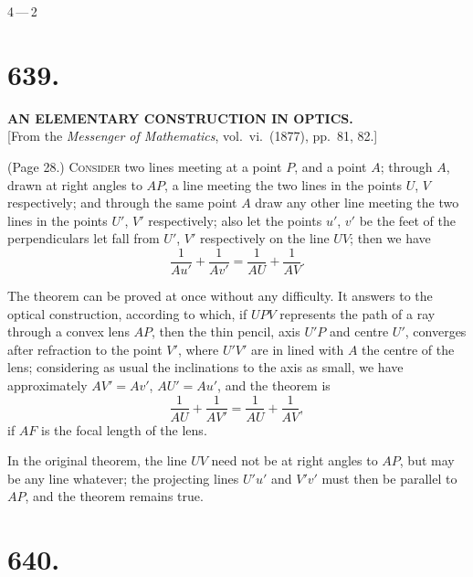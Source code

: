 \documentclass[11pt,a4paper]{article}
\begin{document}
\hfill 4\,---\,2

\bigskip


\section*{639.}

\begin{center}
\textbf{AN ELEMENTARY CONSTRUCTION IN OPTICS.}\\[1em]
[From the \textit{Messenger of Mathematics}, vol.~vi.\ (1877), pp.\ 81, 82.]
\end{center}

\medskip

\noindent (Page 28.) \textsc{Consider} two lines meeting at a point $P$, and a point $A$; through $A$, drawn at right angles to $AP$, a line meeting the two lines in the points $U$, $V$ respectively; and through the same point $A$ draw any other line meeting the two lines in the points $U'$, $V'$ respectively; also let the points $u'$, $v'$ be the feet of the perpendiculars let fall from $U'$, $V'$ respectively on the line $UV$; then we have
\[
\frac{1}{Au'} + \frac{1}{Av'} = \frac{1}{AU} + \frac{1}{AV}.
\]

The theorem can be proved at once without any difficulty. It answers to the optical construction, according to which, if $UPV$ represents the path of a ray through a convex lens $AP$, then the thin pencil, axis $U'P$ and centre $U'$, converges after refraction to the point $V'$, where $U'V'$ are in lined with $A$ the centre of the lens; considering as usual the inclinations to the axis as small, we have approximately $AV' = Av'$, $AU' = Au'$, and the theorem is
\[
\frac{1}{AU} + \frac{1}{AV'} = \frac{1}{AU} + \frac{1}{AV},
\]
if $AF$ is the focal length of the lens.

In the original theorem, the line $UV$ need not be at right angles to $AP$, but may be any line whatever; the projecting lines $U'u'$ and $V'v'$ must then be parallel to $AP$, and the theorem remains true.

\bigskip


\section*{640.}
\end{document}
